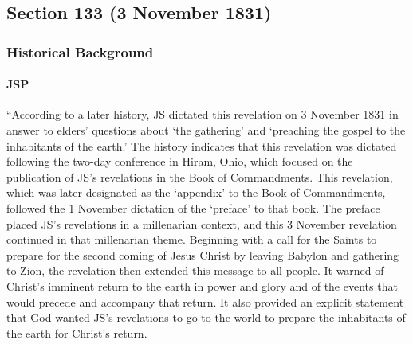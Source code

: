 \subsection{Section 133 (3 November 1831)}
	\label{DC133}
	
	\subsubsection{Historical Background}
		\label{DC133-HB}
		
		\paragraph{JSP}
		
			``According to a later history, JS dictated this revelation on 3 November 1831 in answer to elders' questions about `the gathering' and `preaching the gospel to the inhabitants of the earth.' The history indicates that this revelation was dictated following the two-day conference in Hiram, Ohio, which focused on the publication of JS's revelations in the Book of Commandments. This revelation, which was later designated as the `appendix' to the Book of Commandments, followed the 1 November dictation of the `preface' to that book. The preface placed JS's revelations in a millenarian context, and this 3 November revelation continued in that millenarian theme. Beginning with a call for the Saints to prepare for the second coming of Jesus Christ by leaving Babylon and gathering to Zion, the revelation then extended this message to all people. It warned of Christ's imminent return to the earth in power and glory and of the events that would precede and accompany that return. It also provided an explicit statement that God wanted JS's revelations to go to the world to prepare the inhabitants of the earth for Christ's return.
			
